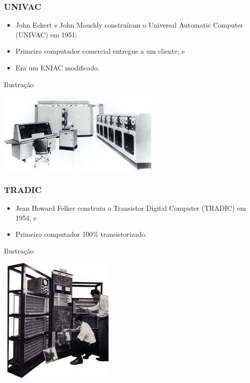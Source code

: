 \documentclass[aspectratio=169]{beamer} %
\begin{document}
\begin{frame}
	\frametitle{UNIVAC}
	
	\begin{itemize}
		\item John Eckert e John Mauchly construíram o Universal Automatic Computer (UNIVAC) em 1951;
		\item Primeiro computador comercial entregue a um cliente; e
		\item Era um ENIAC modificado.
	\end{itemize}\vfill
	
	\begin{exampleblock}{Ilustra\c cão}
		\begin{center}
			\includegraphics[scale=0.5]{img/univac}
		\end{center}
	\end{exampleblock}
\end{frame}

\begin{frame}
	\frametitle{TRADIC}
	
	\begin{itemize}
		\item Jean Howard Felker  construiu o Transistor Digital Computer (TRADIC) em 1954; e
		\item Primeiro computador 100\% transistorizado.
	\end{itemize}\vfill
	
	\begin{exampleblock}{Ilustra\c cão}
		\begin{center}
			\includegraphics[scale=0.5]{img/tradic}
		\end{center}
	\end{exampleblock}
\end{frame}
\end{document}
